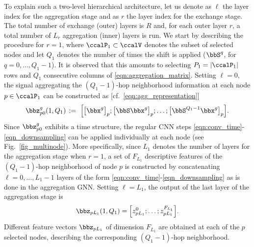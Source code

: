 To explain such a two-level hierarchical architecture, let us denote as $\ell$ the layer index for the aggregation stage and as $r$ the layer index for the exchange stage. The total number of exchange (outer) layers is $R$ and, for each outer layer $r$, a total number of $L_r$ aggregation (inner) layers is run. We start by describing the procedure for $r=1$, where $\ccalP_{1} \subset \ccalV$ denotes the subset of selected nodes and let $Q_{1}$ denotes the number of times the shift is applied ($\bbS^{q}$, for $q=0,\ldots,Q_{1}-1$). It is observed that this amounts to selecting $P_1=|\ccalP_{1}|$ rows and $Q_{1}$ consecutive columns of \eqref{eqn:aggregation_matrix}. Setting $\ell=0$, the signal aggregating the $(Q_{1}-1)$-hop neighborhood information at each node $p \in \ccalP_{1}$ can be constructed as [cf.~\eqref{eqn:agg_representation}]
\begin{equation} \label{eqn:multinode_agg_1}
	\bbz_{p0}^{g}(1,Q_{1}) 
			\,:=\ \Big[ \big[          \bbx^g\big]_{p} ; 
                        \big[\bbS      \bbx^g\big]_{p} ; \ldots ; 
                        \big[\bbS^{Q_{1}-1}\bbx^g\big]_{p} 
                  \Big].
\end{equation}
Since $\bbz_{p0}^{g}$ exhibits a time structure, the regular CNN steps \eqref{eqn:conv_time}-\eqref{eqn_downsampling} can be applied individually at each node (see Fig.~\ref{fig_multinode}). More specifically, since $L_1$ denotes the number of layers for the aggregation stage when $r=1$, a set of $F_{L_{1}}$ descriptive features of the $(Q_{1}-1)$-hop neighborhood of node $p$ is constructed by concatenating $\ell=0,\ldots,L_{1}-1$ layers of the form \eqref{eqn:conv_time}-\eqref{eqn_downsampling} as is done in the aggregation GNN. Setting $\ell=L_1$, the output of the last layer of the aggregation stage is
\begin{equation} \label{eqn:inner_layer_output}
	\bbz_{pL_{1}}(1,Q_{1}) 
		= \Big[ z_{pL_{1}}^{0}; \ldots; z_{pL_{1}}^{F_{L_{1}}} \Big].
\end{equation}
Different feature vectors $\bbz_{p L_{1}}$ of dimension $F_{L_{1}}$ are obtained at each of the $p$ selected nodes, describing the corresponding $(Q_{1}-1)$-hop neighborhood.

